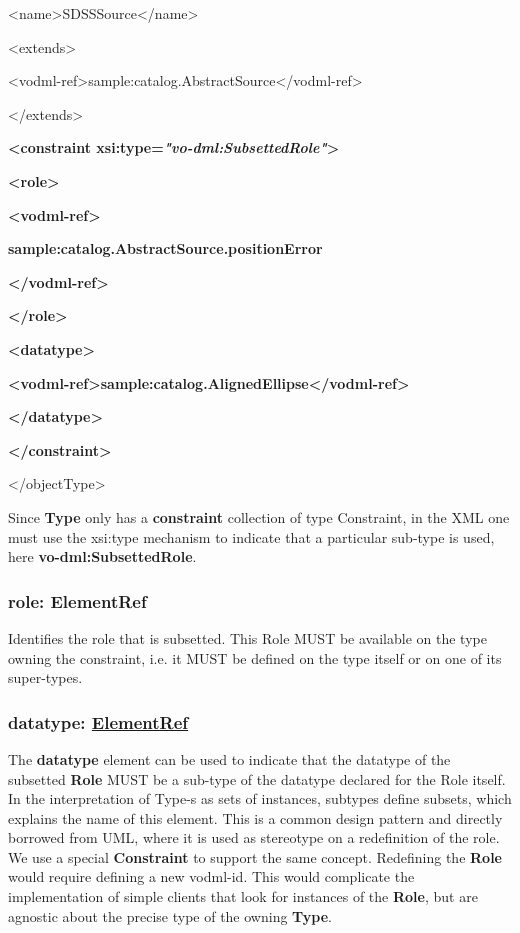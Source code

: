 \documentclass[10pt,a4paper]{ivoa}
\begin{document}
\textless name\textgreater SDSSSource\textless/name\textgreater{}

\textless extends\textgreater{}

\textless vodml-ref\textgreater sample:catalog.AbstractSource\textless/vodml-ref\textgreater{}

\textless/extends\textgreater{}

\textbf{\textless constraint
xsi:type=\emph{"vo-dml:SubsettedRole"}\textgreater{}}

\textbf{\textless role\textgreater{}}

\textbf{\textless vodml-ref\textgreater{}}

\textbf{sample:catalog.AbstractSource.positionError}

\textbf{\textless/vodml-ref\textgreater{}}

\textbf{\textless/role\textgreater{}}

\textbf{\textless datatype\textgreater{}}

\textbf{\textless vodml-ref\textgreater sample:catalog.AlignedEllipse\textless/vodml-ref\textgreater{}}

\textbf{\textless/datatype\textgreater{}}

\textbf{\textless/constraint\textgreater{}}

\textless/objectType\textgreater{}

Since \textbf{Type} only has a \textbf{constraint} collection of type
Constraint, in the XML one must use the xsi:type mechanism to indicate
that a particular sub-type is used, here \textbf{vo-dml:SubsettedRole}.

\hypertarget{role-elementref}{%
\subsubsection{role: ElementRef}\label{role-elementref}}

Identifies the role that is subsetted. This Role MUST be available on
the type owning the constraint, i.e. it MUST be defined on the type
itself or on one of its super-types.

\hypertarget{datatype-elementref-1}{%
\subsubsection{\texorpdfstring{datatype:
\protect\hyperlink{elementref}{ElementRef}}{datatype: ElementRef}}\label{datatype-elementref-1}}

The \textbf{datatype} element can be used to indicate that the datatype
of the subsetted \textbf{Role} MUST be a sub-type of the datatype
declared for the Role itself. In the interpretation of Type-s as sets of
instances, subtypes define subsets, which explains the name of this
element. This is a common design pattern and directly borrowed from UML,
where it is used as stereotype on a redefinition of the role. We use a
special \textbf{Constraint} to support the same concept. Redefining the
\textbf{Role} would require defining a new vodml-id. This would
complicate the implementation of simple clients that look for instances
of the \textbf{Role}, but are agnostic about the precise type of the
owning \textbf{Type}.
\end{document}
